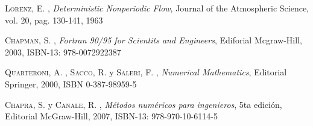 \documentclass[letterpaper]{article}
\begin{document}
\begin{thebibliography}{3}

 \textsc{Lorenz, E.} , \textit{Deterministic Nonperiodic Flow}, Journal of the Atmospheric Science, vol. 20, pag. 130-141, 1963

 \textsc{Chapman, S.} , \textit{Fortran 90/95 for Scientits and Engineers}, Ediforial Mcgraw-Hill, 2003, ISBN-13: 978-0072922387

 \textsc{Quarteroni, A.} , \textsc{Sacco, R.} y \textsc{Saleri, F.} , \textit{Numerical Mathematics},
Editorial Springer, 2000, ISBN 0-387-98959-5

 \textsc{Chapra, S.} y \textsc{Canale, R.} , \textit{Métodos numéricos para ingenieros}, 5ta edición,
Editorial McGraw-Hill, 2007, ISBN-13: 978-970-10-6114-5
\end{thebibliography}
\end{document}
